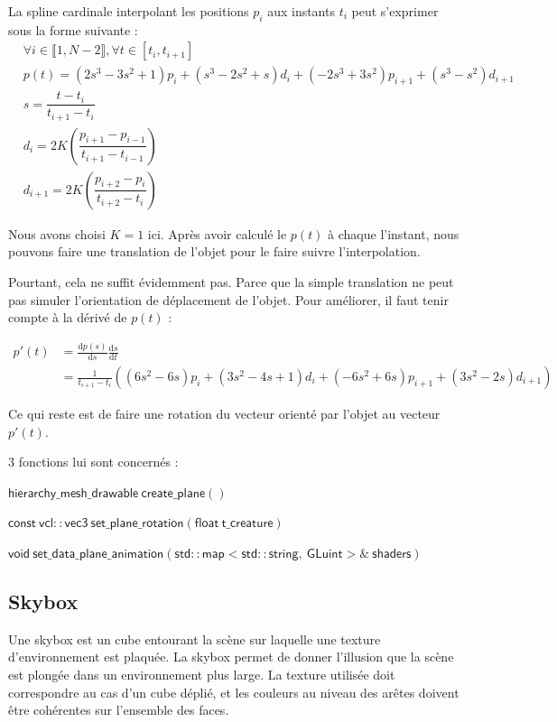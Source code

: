 \documentclass[utf8, a4paper, 12pt]{article}
\begin{document}
La spline cardinale interpolant les positions $ p_i $ aux instants $ t_i $ peut s’exprimer sous la forme suivante : 
\begin{align*}
&\forall i \in \llbracket1,N-2 \rrbracket, \forall t \in [t_i,t_{i+1}] \\
&p(t) = (2 s ^ 3 - 3 s ^ 2 + 1)p_i + (s ^ 3 - 2 s ^ 2 + s)d_i + (-2 s ^ 3 + 3 s ^ 2)p_{i+1} + (s ^ 3 - s^2)d_{i+1} \\
&s =\dfrac{t-t_i}{t_{i+1}-t_i} \\
&d_i = 2K\left(\dfrac{p_{i+1}-p_{i-1}}{t_{i+1}-t_{i-1}} \right) \\
&d_{i+1} = 2K\left(\dfrac{p_{i+2}-p_{i}}{t_{i+2}-t_{i}} \right) 
\end{align*}

Nous avons choisi $K = 1$ ici. Après avoir calculé le $p(t)$ à chaque l'instant, nous pouvons faire une translation de l'objet pour le faire suivre l'interpolation.

Pourtant, cela ne suffit évidemment pas. Parce que la simple translation ne peut pas simuler l'orientation de déplacement de l'objet. Pour améliorer, il faut tenir compte à la dérivé de $p(t)$ : 

\begin{align*}
p'(t) &= \frac{\mathrm{d} p(s)}{\mathrm{d} s}\frac{\mathrm{d} s}{\mathrm{d} t} \\
&= \frac{1}{t_{i+1}-t_i}\left( (6 s ^ 2 - 6 s)p_i + (3s ^ 2 - 4 s + 1)d_i + (-6 s ^ 2 + 6 s)p_{i+1} + (3s ^ 2 - 2s)d_{i+1}\right) 
\end{align*}  

Ce qui reste est de faire une rotation du vecteur orienté par l'objet au vecteur $p'(t)$.

3 fonctions lui sont concernés : 

$\mathsf{hierarchy\_mesh\_drawable\  create\_plane()}$

$\mathsf{const\ vcl::vec3\  set\_plane\_rotation(float\ t\_creature)}$

$\mathsf{void\  set\_data\_plane\_animation(std::map<std::string,\ GLuint>\&\  shaders)}$

\subsection{Skybox}
Une skybox est un cube entourant la scène sur laquelle une texture d’environnement est plaquée. La skybox permet de donner l’illusion que la scène est plongée dans un environnement plus large. La texture utilisée doit correspondre au cas d’un cube déplié, et les couleurs au niveau des arêtes doivent être cohérentes sur l’ensemble des faces.
\end{document}
